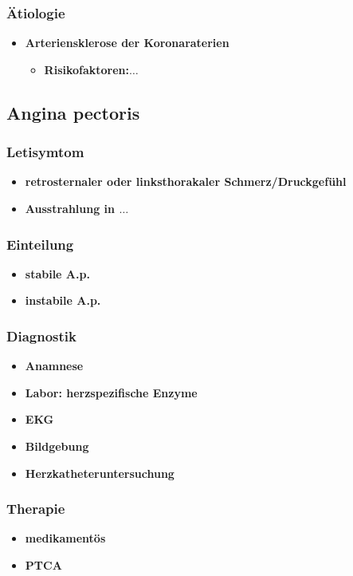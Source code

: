 		\subsubsection{Ätiologie}
			\begin{itemize}
				\item \textbf{Arteriensklerose der Koronaraterien}
					\begin{itemize}
						\item \textbf{Risikofaktoren:$\dots$}
					\end{itemize}
			\end{itemize}
	\subsection{Angina pectoris}
		\subsubsection{Letisymtom}
			\begin{itemize}
				\item \textbf{retrosternaler oder linksthorakaler Schmerz/Druckgefühl}
				\item \textbf{Ausstrahlung in $\dots$}
			\end{itemize}
		\subsubsection{Einteilung}
			\begin{itemize}
				\item \textbf{stabile A.p.}
				\item \textbf{instabile A.p.}
			\end{itemize}
		\subsubsection{Diagnostik}
			\begin{itemize}
				\item \textbf{Anamnese}
				\item \textbf{Labor: herzspezifische Enzyme}
				\item \textbf{EKG}
				\item \textbf{Bildgebung}
				\item \textbf{Herzkatheteruntersuchung}
			\end{itemize}
		\subsubsection{Therapie}
			\begin{itemize}
				\item \textbf{medikamentös}
				\item \textbf{PTCA}
			\end{itemize}
